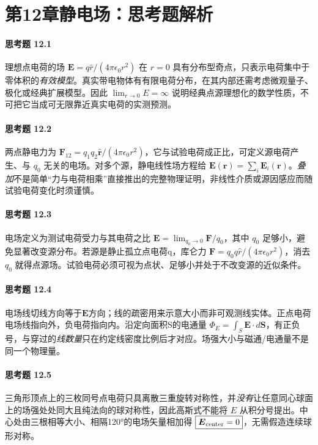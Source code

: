 \section*{第12章\quad 静电场：思考题解析}
\paragraph{思考题 12.1}
理想点电荷的场 \(\boldsymbol E=q\hat r/(4\pi\epsilon_0r^2)\) 在 \(r=0\) 具有分布型奇点，只表示电荷集中于零体积的\emph{有效模型}。真实带电物体有有限电荷分布，在其内部还需考虑微观量子、极化或经典扩展模型。因此 \(\lim_{r\to0}E=\infty\) 说明经典点源理想化的数学性质，不可把它当成可无限靠近真实电荷的实测预测。

\paragraph{思考题 12.2}
两点静电力为 \(\boldsymbol F_{12}=q_1q_2\hat{\boldsymbol r}/(4\pi\epsilon_0r^2)\)，它与试验电荷成正比，可定义源电荷产生、与 \(q_0\) 无关的电场。对多个源，静电线性场方程给 \(\boxed{\boldsymbol E(\boldsymbol r)=\sum_i\boldsymbol E_i(\boldsymbol r)}\)。\emph{叠加}不是简单“力与电荷相乘”直接推出的完整物理证明，非线性介质或源因感应而随试验电荷变化时须谨慎。

\paragraph{思考题 12.3}
电场定义为测试电荷受力与其电荷之比 \(\boxed{\boldsymbol E=\lim_{q_0\to0}\boldsymbol F/q_0}\)，其中 \(q_0\) 足够小，避免显著改变源分布。若源是静止孤立点电荷q，库仑力 \(\boldsymbol F=q_0 q\hat r/(4\pi\epsilon_0r^2)\)，消去 \(q_0\) 就得点源场。试验电荷必须可视为点状、足够小并处于不改变源的近似条件。

\paragraph{思考题 12.4}
电场线切线方向等于\(\boldsymbol E\)方向；线的疏密用来示意大小而非可观测线实体。正点电荷电场线指向外，负电荷指向内。沿定向面积S的电通量 \(\Phi_E=\int_S\boldsymbol E\cdot d\boldsymbol S\)，有正负号，与穿过的\emph{线数量}只在约定线密度比例后才对应。场强大小与磁通/电通量不是同一个物理量。

\paragraph{思考题 12.5}
三角形顶点上的三枚同号点电荷只具离散三重旋转对称性，并\emph{没有}让任意同心球面上的场强处处同大且纯法向的球对称性，因此高斯式不能将 \(E\) 从积分号提出。中心处由三根相等大小、相隔120°的电场矢量相加得 \(\boxed{\boldsymbol E_{\rm center}=0}\)，无需假造连续球形对称。

